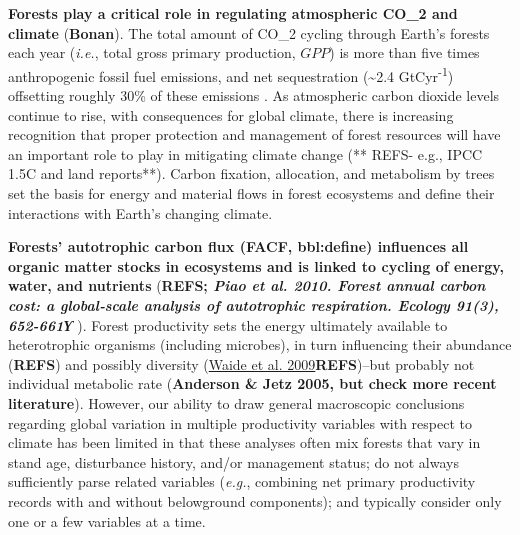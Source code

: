 \documentclass[]{article}
\begin{document}
\textbf{Forests play a critical role in regulating atmospheric CO\_2 and
climate} (\textbf{Bonan}). The total amount of CO\_2 cycling through
Earth's forests each year (\emph{i.e.}, total gross primary production,
\(GPP\)) is more than five times anthropogenic fossil fuel emissions,
and net sequestration (\textasciitilde{}2.4 GtCyr\textsuperscript{-1})
offsetting roughly 30\% of these emissions \citep{pan_large_2011}. As
atmospheric carbon dioxide levels continue to rise, with consequences
for global climate, there is increasing recognition that proper
protection and management of forest resources will have an important
role to play in mitigating climate change (** REFS- e.g., IPCC 1.5C and
land reports**). Carbon fixation, allocation, and metabolism by trees
set the basis for energy and material flows in forest ecosystems and
define their interactions with Earth's changing climate.

\textbf{Forests' autotrophic carbon flux (FACF, bbl:define) influences
all organic matter stocks in ecosystems and is linked to cycling of
energy, water, and nutrients} (\textbf{REFS; \emph{Piao et al. 2010.
Forest annual carbon cost: a global‐scale analysis of autotrophic
respiration. Ecology 91(3), 652-661Ƴ} }). Forest productivity sets the
energy ultimately available to heterotrophic organisms (including
microbes), in turn influencing their abundance (\textbf{REFS}) and
possibly diversity
(\href{https://www.annualreviews.org/doi/abs/10.1146/annurev.ecolsys.30.1.257}{Waide
et al. 2009}\textbf{REFS})--but probably not individual metabolic rate
(\textbf{Anderson \& Jetz 2005, but check more recent literature}).
However, our ability to draw general macroscopic conclusions regarding
global variation in multiple productivity variables with respect to
climate has been limited in that these analyses often mix forests that
vary in stand age, disturbance history, and/or management status; do not
always sufficiently parse related variables (\emph{e.g.}, combining net
primary productivity records with and without belowground components);
and typically consider only one or a few variables at a time.
\end{document}
